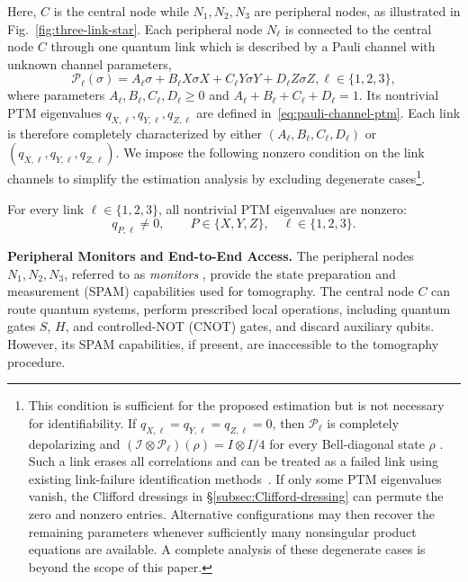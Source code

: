 Here, \(C\)  is the central node while
\(N_1,N_2,N_3\) are peripheral nodes, as illustrated in
Fig.~\ref{fig:three-link-star}.
Each peripheral node $N_\ell$ is connected to the central node $C$ through one
quantum link which is described by a Pauli channel with unknown channel parameters,
\begin{equation}
    \mathcal P_\ell(\!\sigma\!)
    {=}
    A_\ell\sigma
    {+}B_\ell X\sigma X
        {+}C_\ell Y\sigma Y
        {+}D_\ell Z\sigma Z,
\ell {\in}\{\!1,2,3\!\},
    \label{eq:link-pauli-channel}
\end{equation}
where parameters \(A_\ell ,B_\ell ,C_\ell ,D_\ell \geq0\) and
\(A_\ell +B_\ell +C_\ell +D_\ell =1\).
Its nontrivial PTM eigenvalues
\(q_{X,\ell },q_{Y,\ell },q_{Z,\ell }\) are defined in~\eqref{eq:pauli-channel-ptm}.
Each link is therefore completely characterized by either
\((A_\ell,B_\ell,C_\ell,D_\ell)\) or
\((q_{X,\ell},q_{Y,\ell},q_{Z,\ell})\).
We  impose the following nonzero condition on the
link channels to simplify the estimation analysis by excluding
degenerate cases\footnote{This condition is sufficient
    for the proposed estimation but is not necessary for
    identifiability. If
    $q_{X,\ell}=q_{Y,\ell}=q_{Z,\ell}=0$, then
    $\mathcal P_\ell$ is completely depolarizing and
    $(\mathcal I\otimes\mathcal P_\ell)(\rho)=I\otimes I/4$ for every
    Bell-diagonal state $\rho$ \cite{gottesman2026surviving}. Such a link erases all correlations and can
    be treated as a failed link using existing link-failure identification
    methods~\cite{inproceedings,10.1007/978-3-540-24668-8_19}. If only some PTM
    eigenvalues vanish, the Clifford dressings in
    \S\ref{subsec:Clifford-dressing} can permute the zero and nonzero
    entries. Alternative configurations may then recover the remaining
    parameters whenever sufficiently many nonsingular product equations
    are available. A complete analysis of these degenerate cases is beyond
    the scope of this paper.}.
\begin{assumption}
    \label{ass:nonzero-eigenvalues}
    For every link \(\ell\in\{1,2,3\}\), all nontrivial PTM
    eigenvalues are nonzero:
    \begin{equation}
        q_{P,\ell}\neq 0,
        \qquad
        P\in\{X,Y,Z\},\quad \ell\in\{1,2,3\}.
    \end{equation}
\end{assumption}




\textbf{Peripheral Monitors and End-to-End Access.}
The peripheral nodes \(N_1,N_2,N_3\), referred to as
\emph{monitors}
, provide the state preparation and measurement
(SPAM) capabilities used for tomography.
The central node \(C\) can route quantum systems, perform prescribed
local operations, including quantum gates \(S\), \(H\), and controlled-NOT (CNOT) gates,
and discard auxiliary qubits. However, its SPAM capabilities, if
present, are inaccessible to the tomography procedure.

